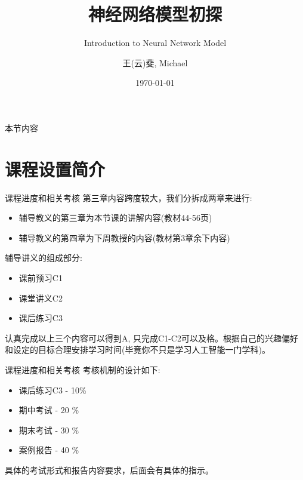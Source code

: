\documentclass[handout]{beamer}
\title[]{神经网络模型初探}
\subtitle{Introduction to Neural Network Model}
\date{\today}
\author[Michael]{王(云)斐, Michael}
\institute[SenseTime]{\url{https://www.michaelyunfei.com} \and \url{https://github.com/Michael-yunfei/MDLforBeginners}}
\begin{document}



\begin{frame}[noframenumbering]
  \titlepage
\end{frame}



\begin{frame}{本节内容}
	\tableofcontents
\end{frame}

\section{课程设置简介}

\begin{frame}{课程进度和相关考核}
第三章内容跨度较大，我们分拆成两章来进行:
\begin{itemize}
\setlength\itemsep{1em}
	\item 辅导教义的第三章为本节课的讲解内容(教材44-56页)
	\item 辅导教义的第四章为下周教授的内容(教材第3章余下内容)
\end{itemize}

\hfil

辅导讲义的组成部分:
\begin{itemize}
\setlength\itemsep{1em}
	\item 课前预习C1
	\item 课堂讲义C2
	\item 课后练习C3
\end{itemize}

\hfil 

认真完成以上三个内容可以得到A, 只完成C1-C2可以及格。根据自己的兴趣偏好和设定的目标合理安排学习时间(毕竟你不只是学习人工智能一门学科)。
\end{frame}

\begin{frame}{课程进度和相关考核}
	考核机制的设计如下:
	
	\hfil
	
	\begin{itemize}
	\setlength\itemsep{1em}
		\item 课后练习C3 - 10\% 
		\item 期中考试 - 20 \% 
		\item 期末考试 - 30 \%
		\item 案例报告 - 40 \% 
	\end{itemize}
	具体的考试形式和报告内容要求，后面会有具体的指示。
\end{frame}
\end{document}
